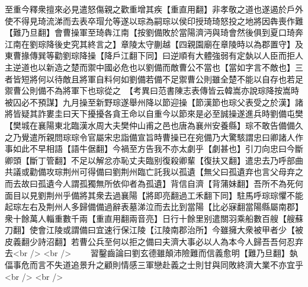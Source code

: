 至重今釋衆擅來必見遣怒傷親之歡重增其疾【重直用翻】非孝敬之道也遂遏於戶外使不得見琦流涕而去表卒瑁允等遂以琮為嗣琮以侯印授琦琦怒投之地將因犇喪作難【難乃旦翻】會曹操軍至琦犇江南【按劉備敗於當陽濟沔與琦會然後俱到夏口琦奔江南在劉琮降後史究其終言之】章陵太守蒯越【四親園廟在章陵時以為郡置守】及東曹掾傳巽等勸劉琮降操【降戶江翻下同】曰逆順有大體強弱有定埶以人臣而拒人主逆道也以新造之楚而禦中國必危也以劉備而敵曹公不當也【當如字言不敵也】三者皆短將何以待敵且將軍自料何如劉備若備不足禦曹公則雖全楚不能以自存也若足禦曹公則備不為將軍下也琮從之　【考異曰范書陳志表傳皆云韓嵩亦說琮降按嵩時被囚必不預謀】九月操至新野琮遂舉州降以節迎操【節漢節也琮父表受之於漢】諸將皆疑其詐婁圭曰天下擾擾各貪王命以自重今以節來是必至誠操遂進兵時劉備屯樊【樊城在襄陽東北臨漢水周大夫樊仲山甫之邑也唐為襄州安養縣】琮不敢告備備久之乃覺遣所親問琮琮令官屬宋忠詣備宣旨時曹操已在宛備乃大驚駭謂忠曰卿諸人作事如此不早相語【語牛倨翻】今禍至方告我不亦太劇乎【劇甚也】引刀向忠曰今斷卿頭【斷丁管翻】不足以解忿亦恥丈夫臨别復殺卿輩【復扶又翻】遣忠去乃呼部曲共議或勸備攻琮荆州可得備曰劉荆州臨亡託我以孤遺【無父曰孤遺弃也言父母弃之而去故曰孤遺今人謂孤獨無所依仰者為孤遺】背信自濟【背蒲妹翻】吾所不為死何面目以見劉荆州乎備將其衆去過襄陽【將即亮翻過工禾翻下同】駐馬呼琮琮懼不能起琮左右及荆州人多歸備備過辭表墓涕泣而去比到當陽【比必寐翻當陽縣屬南郡】衆十餘萬人輜重數千兩【重直用翻兩音亮】日行十餘里别遣關羽乘船數百艘【艘蘇刀翻】使會江陵或謂備曰宜速行保江陵【江陵南郡治所】今雖擁大衆被甲者少【被皮義翻少詩沼翻】若曹公兵至何以拒之備曰夫濟大事必以人為本今人歸吾吾何忍弃去<br />
<br />
　　習鑿齒論曰劉玄德雖顛沛險難而信義愈明【難乃旦翻】埶偪事危而言不失道追景升之顧則情感三軍戀赴義之士則甘與同敗終濟大業不亦宜乎<br />
<br />
